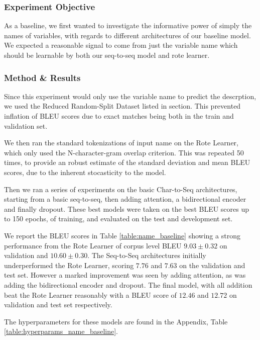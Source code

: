 \subsubsection{Experiment Objective} %

As a baseline, we first wanted to investigate the informative power of simply the names of variables, with regards to different architectures of our baseline model.
We expected a reasonable signal to come from just the variable name which should be learnable by both our seq-to-seq model and rote learner. 

\subsubsection{Method \& Results} %

Since this experiment would only use the variable name to predict the descrption, we used the Reduced Random-Split Dataset listed in section.
This prevented inflation of BLEU scores due to exact matches being both in the train and validation set.

We then ran the standard tokenizations of input name on the Rote Learner, which only used the N-character-gram overlap criterion.
This was repeated 50 times, to provide an robust estimate of the standard deviation and mean BLEU scores, due to the inherent stocasticity to the model.

Then we ran a series of experiments on the basic Char-to-Seq architectures, starting from a basic seq-to-seq, then adding attention, a bidirectional encoder and finally dropout.
These best models were taken on the best BLEU scores up to 150 epochs, of training, and evaluated on the test and development set. %

We report the BLEU scores in Table \ref{table:name_baseline} showing a strong performance from the Rote Learner of corpus level BLEU $9.03 \pm 0.32$ on validation and $10.60 \pm  0.30$. 
The Seq-to-Seq architectures initially underperformed the Rote Learner, scoring $7.76 $ and $  7.63$ on the validation and test set. However a marked improvement was seen by adding attention, as was adding the bidirectional encoder and dropout. 
The final model, with all addition beat the Rote Learner reasonably with a BLEU score of $12.46 $ and $12.72$ on validation and test set respectively.

The hyperparameters for these models are found in the Appendix, Table \ref{table:hyperparams_name_baseline}.


